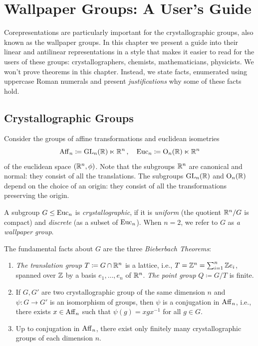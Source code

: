 \chapter{Wallpaper Groups: A User's Guide}\label{chap:physics}
Corepresentations are particularly important for the crystallographic groups, also known as the wallpaper groups.
In this chapter we present a guide into their linear and antilinear representations
in a style that makes it easier to read for the users of these groups: crystallographers, chemists, mathematicians, physicists.
We won't prove theorems in this chapter. Instead, we state facts, enumerated using uppercase Roman numerals and
present {\em justifications} why some of these facts hold.

\section{Crystallographic Groups} \label{section:algebra_cryst}
Consider the groups of affine transformations and euclidean isometries
\[ \operatorname{Aff}_n \coloneqq \operatorname{GL}_n ({\mathbb R})\ltimes {\mathbb R}^n \, , \quad \operatorname{Euc}_n \coloneqq \mathrm{O}_n ({\mathbb R})\ltimes {\mathbb R}^n \]
of the euclidean space $({\mathbb R}^n,\phi)$. Note that the subgroups ${\mathbb R}^n$ are canonical and normal: they consist of all the translations.
The subgroups $\operatorname{GL}_n ({\mathbb R})$  and $\mathrm{O}_n ({\mathbb R})$ depend on the choice of an origin:
they consist of all the transformations preserving the origin.

A subgroup $G \leq \operatorname{Euc}_n$ is {\em crystallographic}, if it is {\em uniform} (the quotient ${\mathbb R}^n/G$ is compact)
and {\em discrete} (as a subset of $\operatorname{Euc}_n$). When $n=2$, we refer to $G$ as {\em a wallpaper group}.


The fundamental facts about $G$ are the three {\em Bieberbach Theorems}:
\begin{enumerate}[label=\textnormal{(\Roman*)}]
\item {\em The translation group} $T\coloneqq G \cap {\mathbb R}^n$ is a lattice, i.e., $T={\mathbb Z}^n = \sum_{i=1}^n {\mathbb Z} e_i$, spanned over ${\mathbb Z}$ by a basis $e_1, \ldots, e_n$ of ${\mathbb R}^n$.
{\em The point group} $Q\coloneqq G/T$ is finite.  
\item If $G,G'$ are two crystallographic group of the same dimension $n$ and $\psi: G \to G'$ is an isomorphism of groups,
  then $\psi$ is a conjugation in $\operatorname{Aff}_n$, i.e., there exists $x\in\operatorname{Aff}_n$ such that $\psi (g) = xgx^{-1}$ for all $g\in G$.
\item Up to conjugation in $\operatorname{Aff}_n$, there exist only finitely many crystallographic groups of each dimension $n$. 
\end{enumerate}  

